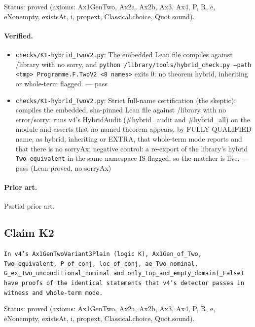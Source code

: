\documentclass{article}
\begin{document}
Status: proved (axioms: Ax1GenTwo, Ax2a, Ax2b, Ax3, Ax4, P, R, e, eNonempty, existsAt, i, propext, Classical.choice, Quot.sound).

\paragraph{Verified.}
\begin{itemize}
\item \texttt{checks/K1-hybrid\_TwoV2.py}: The embedded Lean file compiles against /library with no sorry, and \texttt{python /library/tools/hybrid\_check.py --path \textless{}tmp\textgreater{} Programme.F.TwoV2 \textless{}8 names\textgreater{}} exits 0: no theorem hybrid, inheriting or whole-term flagged. --- pass
\item \texttt{checks/K1-hybrid\_TwoV2.py}: Strict full-name certification (the skeptic): compiles the embedded, sha-pinned Lean file against /library with no error/sorry; runs v4's HybridAudit (\#hybrid\_audit and \#hybrid\_all) on the module and asserts that no named theorem appears, by FULLY QUALIFIED name, as hybrid, inheriting or EXTRA, that whole-term mode reports and that there is no sorryAx; negative control: a re-export of the library's hybrid \texttt{Two\_equivalent} in the same namespace IS flagged, so the matcher is live. --- pass (Lean-proved, no sorryAx)
\end{itemize}

\paragraph{Prior art.} Partial prior art.

\subsection*{Claim K2}

\texttt{In v4's Ax1GenTwoVariant3Plain (logic K), Ax1Gen\_of\_Two, Two\_equivalent, P\_of\_conj, loc\_of\_conj, ae\_Two\_nominal, G\_ex\_Two\_unconditional\_nominal and only\_top\_and\_empty\_domain(\_False) have proofs of the identical statements that v4's detector passes in witness and whole-term mode.}

Status: proved (axioms: Ax1GenTwo, Ax2a, Ax2b, Ax3, Ax4, P, R, e, eNonempty, existsAt, i, propext, Classical.choice, Quot.sound).
\end{document}
